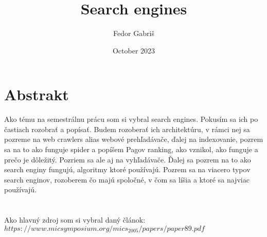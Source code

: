 \documentclass{article}
\title{Search engines}
\author{Fedor Gabriš }
\date{October 2023}
\begin{document}
\maketitle

\section{Abstrakt}
Ako tému na semestrálnu prácu som si vybral search engines. Pokusím sa ich po častiach rozobrať a popísať. Budem rozoberať ich architektúru, v rámci nej sa pozreme na web crawlers alias webové prehľadávače, ďalej na indexovanie, pozrem sa na to ako funguje spider a popíšem Pagov ranking, ako vznikol, ako funguje a prečo je dôležitý. Pozriem sa ale aj na vyhľadávače. Ďalej sa pozrem na to ako search enginy fungujú, algoritmy ktoré používajú. Pozrem sa na viacero typov search enginov, rozoberem čo majú spoločné, v čom sa líšia a ktoré sa najviac používajú. 
\\ 
\\
\\
Ako hlavný zdroj som si vybral daný článok:\\
$https://www.micsymposium.org/mics_2005/papers/paper89.pdf$
\end{document}
